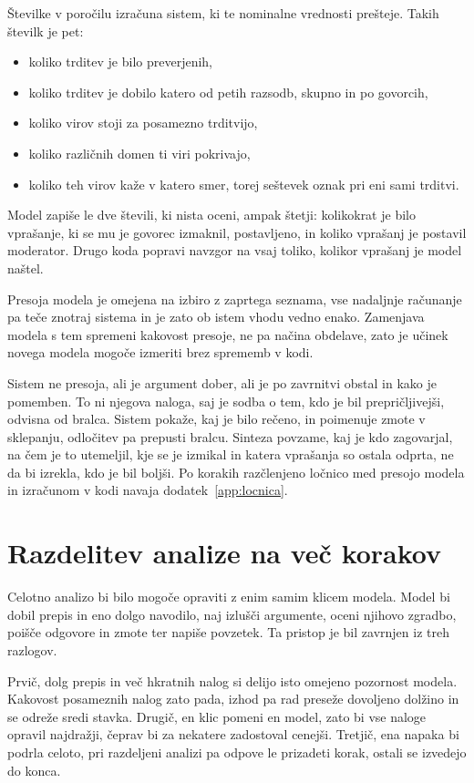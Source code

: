 \documentclass[a4paper, 12pt]{book}
\begin{document}
Številke v poročilu izračuna sistem, ki te nominalne vrednosti prešteje. Takih
številk je pet:

\begin{itemize}
\item koliko trditev je bilo preverjenih,
\item koliko trditev je dobilo katero od petih razsodb, skupno in po govorcih,
\item koliko virov stoji za posamezno trditvijo,
\item koliko različnih domen ti viri pokrivajo,
\item koliko teh virov kaže v katero smer, torej seštevek oznak pri eni sami
trditvi.
\end{itemize}

Model zapiše le dve števili, ki nista oceni, ampak štetji: kolikokrat je bilo
vprašanje, ki se mu je govorec izmaknil, postavljeno, in koliko vprašanj je
postavil moderator. Drugo koda popravi navzgor na vsaj toliko, kolikor vprašanj
je model naštel.

Presoja modela je omejena na izbiro z zaprtega seznama, vse nadaljnje računanje
pa teče znotraj sistema in je zato ob istem vhodu vedno enako. Zamenjava modela s tem
spremeni kakovost presoje, ne pa načina obdelave, zato je učinek novega modela
mogoče izmeriti brez sprememb v kodi.

Sistem ne presoja, ali je argument dober, ali je po zavrnitvi obstal in kako je
pomemben. To ni njegova naloga, saj je sodba o tem, kdo je bil prepričljivejši,
odvisna od bralca. Sistem pokaže, kaj je bilo rečeno, in
poimenuje zmote v sklepanju, odločitev pa prepusti bralcu. Sinteza povzame, kaj je kdo zagovarjal, na čem je to utemeljil, kje se je
izmikal in katera vprašanja so ostala odprta, ne da bi izrekla, kdo je bil
boljši. Po korakih razčlenjeno ločnico med presojo modela in izračunom v kodi
navaja dodatek~\ref{app:locnica}.

\section{Razdelitev analize na več korakov}
\label{sec:koraki}

Celotno analizo bi bilo mogoče opraviti z enim samim klicem modela. Model bi dobil prepis in eno dolgo navodilo, naj izlušči argumente, oceni njihovo
zgradbo, poišče odgovore in zmote ter napiše povzetek. Ta pristop je bil
zavrnjen iz treh razlogov.

Prvič, dolg prepis in več hkratnih nalog si delijo isto omejeno pozornost
modela. Kakovost posameznih nalog zato pada, izhod pa rad preseže dovoljeno
dolžino in se odreže sredi stavka. Drugič, en klic pomeni en model, zato bi vse
naloge opravil najdražji, čeprav bi za nekatere zadostoval cenejši. Tretjič, ena
napaka bi podrla celoto, pri razdeljeni analizi pa odpove le prizadeti korak,
ostali se izvedejo do konca.
\end{document}
